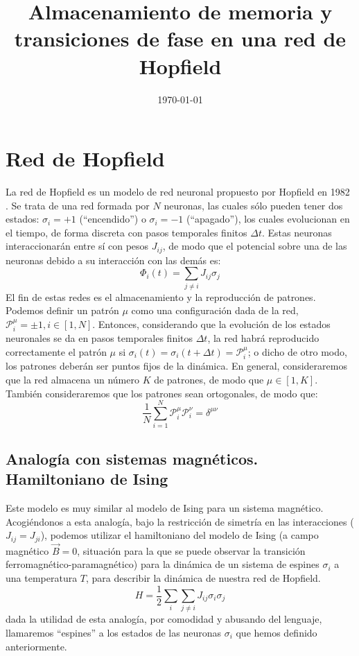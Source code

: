 \documentclass[titlepage,12pt]{article}
\title{\textbf{Almacenamiento de memoria y transiciones de fase en una red de Hopfield}}
\author{}
\date{\today}
\numberwithin{equation}{section}
\begin{document}
	\maketitle
	\fontsize{15pt}{0}\tableofcontents
	\newpage
	
	
	\section{Red de Hopfield}
	\fontsize{12pt}{0}
	La red de Hopfield es un modelo de red neuronal propuesto por Hopfield en 1982 \cite{hopfield82}. Se trata de una red formada por $N$ neuronas, las cuales sólo pueden tener dos estados: $\sigma_i = +1$ (``encendido'') o $\sigma_i=-1$ (``apagado''), los cuales evolucionan en el tiempo, de forma discreta con pasos temporales finitos $\Delta t$. Estas neuronas interaccionarán entre sí con pesos $J_{ij}$, de modo que el potencial sobre una de las neuronas debido a su interacción con las demás es:
	\begin{displaymath}
	\Phi_i(t)=\sum_{j\neq i} J_{ij}\sigma_j
	\end{displaymath}
	El fin de estas redes es el almacenamiento y la reproducción de patrones. Podemos definir un patrón $\mu$ como una configuración dada de la red, $\mathcal{P}^\mu_i = \pm1, i \in[1,N]$. Entonces, considerando que la evolución de los estados neuronales se da en pasos temporales finitos $\Delta t$, la red habrá reproducido correctamente el patrón $\mu$ si $\sigma_i(t)=\sigma_i(t+\Delta t)=\mathcal{P}^\mu_i$; o dicho de otro modo, los patrones deberán ser puntos fijos de la dinámica. En general, consideraremos que la red almacena un número $K$ de patrones, de modo que $\mu\in[1,K]$. También consideraremos que los patrones sean ortogonales, de modo que:
	\begin{equation}
	\frac{1}{N}\sum_{i=1}^N \mathcal{P}^\mu_i \mathcal{P}^\nu_i = \delta^{\mu\nu}
	\label{ortpat}
	\end{equation}
	\subsection{Analogía con sistemas magnéticos. Hamiltoniano de Ising}
	Este modelo es muy similar al modelo de Ising para un sistema magnético. Acogiéndonos a esta analogía, bajo la restricción de simetría en las interacciones ($J_{ij}=J_{ji}$), podemos utilizar el hamiltoniano del modelo de Ising (a campo magnético $\vec{B}=0$, situación para la que se puede observar la transición ferromagnético-paramagnético) para la dinámica de un sistema de espines $\sigma_i$ a una temperatura $T$, para describir la dinámica de nuestra red de Hopfield.
	\begin{equation}
	H = \frac{1}{2}\sum_{i}\sum_{j\neq i}J_{ij}\sigma_i\sigma_j
	\label{HIsing}
	\end{equation}
	dada la utilidad de esta analogía, por comodidad y abusando del lenguaje, llamaremos ``espines'' a los estados de las neuronas $\sigma_i$ que hemos definido anteriormente. 
\end{document}
